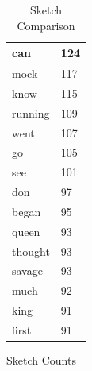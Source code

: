 \documentclass[shortpaper]{revdetua}
\begin{document}
\begin{table}[!htb]
\begin{subtable}{.5\linewidth}
\begin{tabular}{|l|l|}
            can     & 124    \\ \hline
            mock    & 117    \\ \hline
            know    & 115    \\ \hline
            running & 109    \\ \hline
            went    & 107    \\ \hline
            go      & 105    \\ \hline
            see     & 101    \\ \hline
            don     & 97     \\ \hline
            began   & 95     \\ \hline
            queen   & 93     \\ \hline
            thought & 93     \\ \hline
            savage  & 93     \\ \hline
            much    & 92     \\ \hline
            king    & 91     \\ \hline
            first   & 91     \\ \hline
        \end{tabular}
        \caption{Sketch Counts}
    \end{subtable} 
    \caption{Sketch Comparison}
\end{table}  
\end{document}
